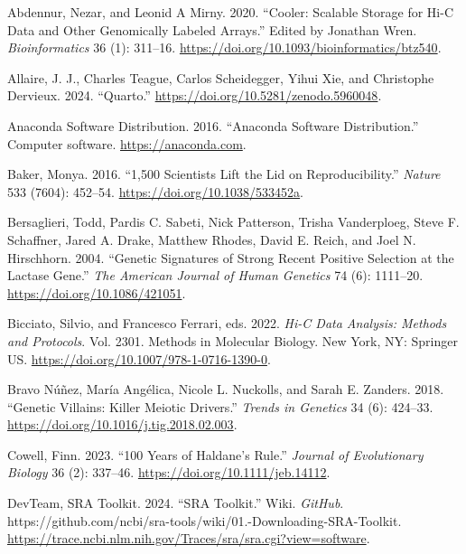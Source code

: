 \documentclass[
  11pt,
  a4paper,
]{scrbook}
\newlength{\cslhangindent}
\newenvironment{CSLReferences}[2] %
 {\begin{list}{}{%
  \setlength{\itemindent}{0pt}
  \setlength{\leftmargin}{0pt}
  \setlength{\parsep}{0pt}
  \ifodd #1
   \setlength{\leftmargin}{\cslhangindent}
   \setlength{\itemindent}{-1\cslhangindent}
  \fi
  \setlength{\itemsep}{#2\baselineskip}}}
 {\end{list}}
\begin{document}
\label{refs}
\begin{CSLReferences}{1}{0}
Abdennur, Nezar, and Leonid A Mirny. 2020. {``Cooler: Scalable Storage
for {Hi-C} Data and Other Genomically Labeled Arrays.''} Edited by
Jonathan Wren. \emph{Bioinformatics} 36 (1): 311--16.
\url{https://doi.org/10.1093/bioinformatics/btz540}.

Allaire, J. J., Charles Teague, Carlos Scheidegger, Yihui Xie, and
Christophe Dervieux. 2024. {``{Quarto}.''}
\url{https://doi.org/10.5281/zenodo.5960048}.

Anaconda Software Distribution. 2016. {``Anaconda Software
Distribution.''} Computer software. \url{https://anaconda.com}.

Baker, Monya. 2016. {``1,500 Scientists Lift the Lid on
Reproducibility.''} \emph{Nature} 533 (7604): 452--54.
\url{https://doi.org/10.1038/533452a}.

Bersaglieri, Todd, Pardis C. Sabeti, Nick Patterson, Trisha Vanderploeg,
Steve F. Schaffner, Jared A. Drake, Matthew Rhodes, David E. Reich, and
Joel N. Hirschhorn. 2004. {``Genetic {Signatures} of {Strong Recent
Positive Selection} at the {Lactase Gene}.''} \emph{The American Journal
of Human Genetics} 74 (6): 1111--20.
\url{https://doi.org/10.1086/421051}.

Bicciato, Silvio, and Francesco Ferrari, eds. 2022. \emph{Hi-{C Data
Analysis}: {Methods} and {Protocols}}. Vol. 2301. Methods in {Molecular
Biology}. New York, NY: Springer US.
\url{https://doi.org/10.1007/978-1-0716-1390-0}.

Bravo Núñez, María Angélica, Nicole L. Nuckolls, and Sarah E. Zanders.
2018. {``Genetic {Villains}: {Killer Meiotic Drivers}.''} \emph{Trends
in Genetics} 34 (6): 424--33.
\url{https://doi.org/10.1016/j.tig.2018.02.003}.

Cowell, Finn. 2023. {``100 Years of {Haldane}'s Rule.''} \emph{Journal
of Evolutionary Biology} 36 (2): 337--46.
\url{https://doi.org/10.1111/jeb.14112}.

DevTeam, SRA Toolkit. 2024. {``{SRA Toolkit}.''} Wiki. \emph{GitHub}.
https://github.com/ncbi/sra-tools/wiki/01.-Downloading-SRA-Toolkit.
\url{https://trace.ncbi.nlm.nih.gov/Traces/sra/sra.cgi?view=software}.


\end{CSLReferences}
\end{document}
